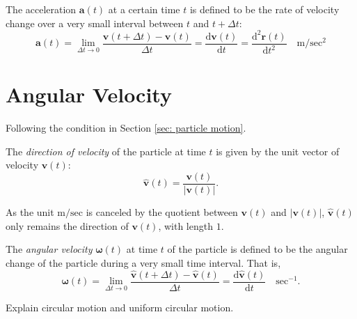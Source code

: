 The acceleration $\mathbf a(t)$ at a certain time $t$ is defined to be the rate of velocity change over a very small interval between $t$ and $t + \Delta t$:
\begin{equation}
	\label{eq: acceleration}
	\mathbf a(t) = \lim_{\Delta t \to 0} \frac{\mathbf v(t + \Delta t) - \mathbf v(t)}{\Delta t} = \frac{\mathrm d \mathbf v(t)}{\mathrm d t} = \frac{\mathrm d^2 \mathbf r(t)}{\mathrm d t^2} \quad \mathrm{m/sec^2}
\end{equation}




\section{Angular Velocity}


Following the condition in Section \ref{sec: particle motion}.

The \textit{direction of velocity} of the particle at time $t$ is given by the unit vector of velocity $\mathbf v(t)$:
\begin{equation}
	\label{eq: direction of velocity}
	\mathbf{\hat v}(t) = \frac{\mathbf v(t)}{| \mathbf v(t) |}.
\end{equation}

As the unit $\mathrm{m/sec}$ is canceled by the quotient between $\mathbf v(t)$ and $| \mathbf v(t) |$, $\mathbf{\hat v}(t)$ only remains the direction of $\mathbf v(t)$, with length $1$.

The \textit{angular velocity} $\boldsymbol{\omega}(t)$ at time $t$ of the particle is defined to be the angular change of the particle during a very small time interval. That is,
\begin{equation}
	\label{eq: angular velocity}
	\boldsymbol{\omega}(t) = \lim_{\Delta t \to 0} \frac{\mathbf{\hat v}(t + \Delta t) - \mathbf{\hat v}(t)}{\Delta t} = \frac{\mathrm d \mathbf{\hat v}(t)}{\mathrm dt} \quad \mathrm{sec^{-1}}.
\end{equation}


\begin{problem}
	Explain circular motion and uniform circular motion.
\end{problem}




